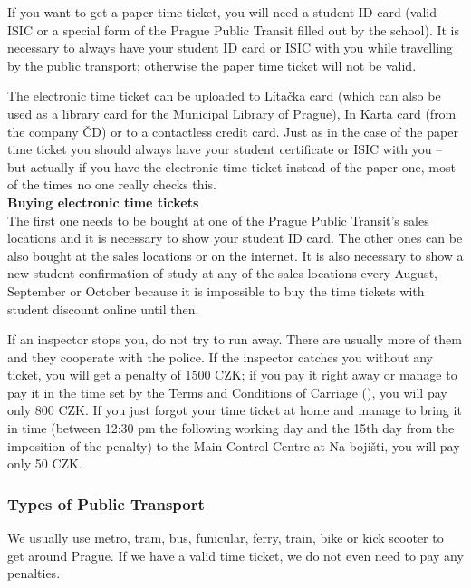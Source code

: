 If you want to get a paper time ticket, you will need a student ID card (valid
ISIC or a special form of the Prague Public Transit filled out by the school).
It is necessary to always have your student ID card or ISIC with you while
travelling by the public transport; otherwise the paper time ticket will not be
valid.

The electronic time ticket can be uploaded to Lítačka card (which can also be
used as a library card for the Municipal Library of Prague), In Karta card (from
the company ČD) or to a contactless credit card.
Just as in the case of the paper time ticket you should always have your student
certificate or ISIC with you -- but actually if you have the electronic time
ticket instead of the paper one, most of the times no one really checks this.
\\
\textbf{Buying electronic time tickets}
\\
The first one needs to be bought at one of the Prague Public Transit's sales
locations and it is necessary to show your student ID card.
The other ones can be also bought at the sales locations or on the internet.
It is also necessary to show a new student confirmation of study at any of the
sales locations every August, September or October because it is impossible to
buy the time tickets with student discount online until then.


If an inspector stops you, do not try to run away. There are usually more of
them and they cooperate with the police.
If the inspector catches you without any ticket, you will get a penalty of 1500
CZK; if you pay it right away or manage to pay it in the time set by the Terms
and Conditions of Carriage (),
you will pay only 800 CZK. If you just forgot your time ticket at home and
manage to bring it in time (between 12:30 pm the following working day and the
15th day from the imposition of the penalty) to the Main Control Centre at Na
bojišti, you will pay only 50 CZK.


\subsubsection{Types of Public Transport}
We usually use metro, tram, bus, funicular, ferry, train, bike or kick scooter
to get around Prague. If we have a valid time ticket, we do not even need to pay
any penalties.

